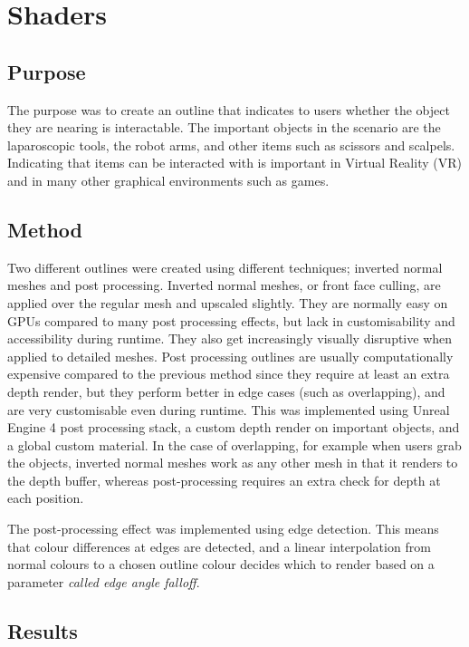 \chapter*{Shaders}

\section*{Purpose}
The purpose was to create an outline that indicates to users whether the object they are nearing is interactable. The important objects in the scenario are the laparoscopic tools, the robot arms, and other items such as scissors and scalpels. Indicating that items can be interacted with is important in Virtual Reality (VR) and in many other graphical environments such as games.

\section*{Method}
Two different outlines were created using different techniques; inverted normal meshes and post processing. Inverted normal meshes, or front face culling, are applied over the regular mesh and upscaled slightly. They are normally easy on GPUs compared to many post processing effects, but lack in customisability and accessibility during runtime. They also get increasingly visually disruptive when applied to detailed meshes. Post processing outlines are usually computationally expensive compared to the previous method since they require at least an extra depth render, but they perform better in edge cases (such as overlapping), and are very customisable even during runtime. This was implemented using Unreal Engine 4 post processing stack, a custom depth render on important objects, and a global custom material. In the case of overlapping, for example when users grab the objects, inverted normal meshes work as any other mesh in that it renders to the depth buffer, whereas post-processing requires an extra check for depth at each position.

The post-processing effect was implemented using edge detection. This means that colour differences at edges are detected, and a linear interpolation from normal colours to a chosen outline colour decides which to render based on a parameter \textit{called edge angle falloff}.

\section*{Results}

